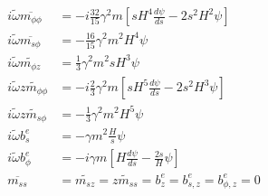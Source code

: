 \begin{equation}\label{eqn:eigen-pgmag-toroidal-quadrupole}
\begin{aligned}
    i \widetilde{\omega} \overline{m_{\phi\phi}} &= - i \frac{32}{15}\gamma^2 m \left[s H^4 \frac{d\psi}{d s} - 2s^2H^2 \psi \right] \\
    i \widetilde{\omega} \overline{m_{s\phi}} &= - \frac{16}{15} \gamma^{2} m^{2} H^4 \psi \\
    i \widetilde{\omega} \widetilde{m_{\phi z}} &= \frac{1}{3} \gamma^{2} m^{2} s H^3 \psi \\
    i \widetilde{\omega} \widetilde{zm_{\phi\phi}} &= -i \frac{2}{3}\gamma^2 m \left[sH^5 \frac{d\psi}{d s} - 2s^2 H^3 \psi\right] \\
    i \widetilde{\omega} \widetilde{zm_{s\phi}} &= -\frac{1}{3}\gamma^{2} m^{2} H^5 \psi \\
    i \widetilde{\omega} b_{s}^e &= - \gamma m^{2} \frac{H}{s} \psi \\
    i \widetilde{\omega} b_{\phi}^e &= -i \gamma m \left[H \frac{d\psi}{d s} - \frac{2 s}{H}\psi\right] \\
    \overline{m_{ss}} &= \widetilde{m_{sz}} = \widetilde{zm_{ss}} = b_{z}^e = b_{s, z}^e = b_{\phi, z}^e = 0
\end{aligned}
\end{equation}
